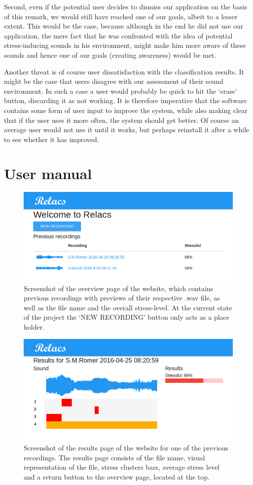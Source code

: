 \documentclass[a4paper]{article}
\begin{document}
Second, even if the potential user decides to dismiss our application on the basis of this remark, we would still have reached one of our goals, albeit to a lesser extent.
This would be the case, because although in the end he did not use our application,
the mere fact that he was confronted with the idea of potential stress-inducing sounds in his environment, might make him more aware of these sounds and hence one of our goals (creating awareness) would be met.

Another threat is of course user dissatisfaction with the classification results.
It might be the case that users disagree with our assessment of their sound environment.
In such a case a user would probably be quick to hit the `erase' button, discarding it as not working.
It is therefore imperative that the software contains some form of user input to improve the system, while also making clear that if the user uses it more often, the system should get better.
Of course an average user would not use it until it works, but perhaps reinstall it after a while to see whether it has improved.

\section{User manual}
\begin{figure}[t]
\centering
\includegraphics[width=0.7\linewidth]{./Website}
\caption{Screenshot of the overview page of the website, which contains previous recordings with previews of their respective .wav file, as well as the file name and the overall stress-level. At the current state of the project the `NEW RECORDING' button only acts as a place holder.}
\label{fig:Website}
\end{figure}

\begin{figure}[t]
	\centering
	\includegraphics[width=0.7\linewidth]{./Audio1Results}
	\caption{Screenshot of the results page of the website for one of the previous recordings. The results page consists of the file name, visual representation of the file, stress clusters bars, average stress level and a return button to the overview page, located at the top.}
	\label{fig:Audio1}
\end{figure}
\end{document}
